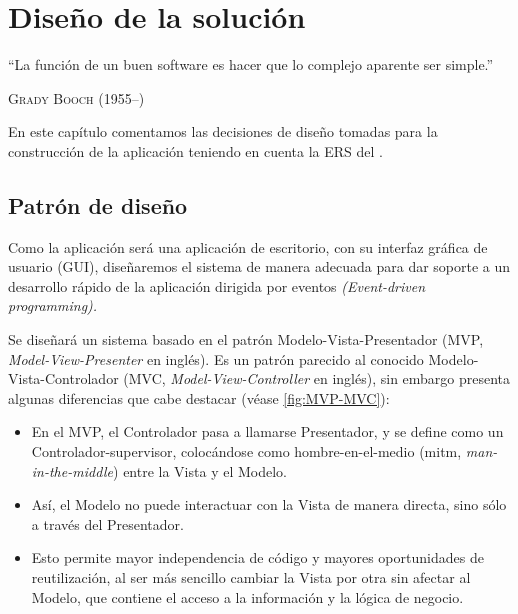 
\chapter{Diseño de la solución}

\epigraph{``La función de un buen software es hacer que lo complejo aparente ser simple.''}{\textsc{Grady Booch} (1955--)}

En este capítulo comentamos las decisiones de diseño tomadas para la construcción de la aplicación teniendo en cuenta la ERS del .

\section{Patrón de diseño}

Como la aplicación será una aplicación de escritorio, con su interfaz gráfica de usuario (GUI), diseñaremos el sistema de manera adecuada para dar soporte a un desarrollo rápido de la aplicación dirigida por eventos \emph{(Event-driven programming).}

Se diseñará un sistema basado en el patrón Modelo-Vista-Presentador (MVP, \emph{Model-View-Presenter} en inglés). Es un patrón parecido al conocido Modelo-Vista-Controlador (MVC, \emph{Model-View-Controller} en inglés), sin embargo presenta algunas diferencias que cabe destacar (véase \autoref{fig:MVP-MVC}):

\begin{itemize}
\item En el MVP, el Controlador pasa a llamarse Presentador, y se define como un Controlador-supervisor, colocándose como hombre-en-el-medio (mitm, \emph{man-in-the-middle}) entre la Vista y el Modelo.
\item Así, el Modelo no puede interactuar con la Vista de manera directa, sino sólo a través del Presentador.
\item Esto permite mayor independencia de código y mayores oportunidades de reutilización, al ser más sencillo cambiar la Vista por otra sin afectar al Modelo, que contiene el acceso a la información y la lógica de negocio.
\end{itemize}

